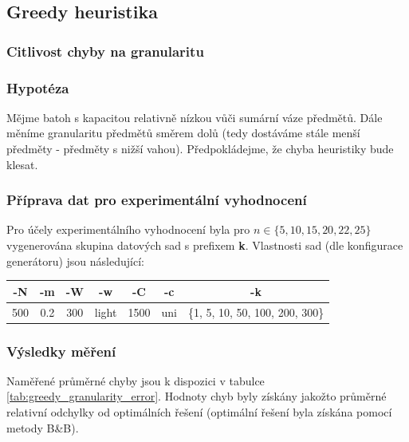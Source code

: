 \documentclass[12pt]{article}
\begin{document}
\subsection{Greedy heuristika}

\subsubsection{Citlivost chyby na granularitu}

\subsubsection*{Hypotéza} \label{section:greedy_granularity_hyp}

Mějme batoh s kapacitou relativně nízkou vůči sumární váze předmětů. Dále měníme granularitu předmětů směrem dolů (tedy dostáváme stále menší předměty - předměty s nižší vahou). Předpokládejme, že chyba heuristiky bude klesat.

\subsubsection*{Příprava dat pro experimentální vyhodnocení}

Pro účely experimentálního vyhodnocení byla pro $n \in \{5, 10, 15, 20, 22, 25\}$ vygenerována skupina datových sad s prefixem \textbf{k}.
Vlastnosti sad (dle konfigurace generátoru) jsou následující:

\begin{center}
    \begin{tabular}{|c | c | c | c | c | c | c|}
        \hline
        -N & -m & -W & -w & -C & -c & -k \\ [0.1ex]
        \hline\hline
        500 & 0.2 & 300 & light & 1500 & uni & \{1, 5, 10, 50, 100, 200, 300\}\\
        \hline
    \end{tabular}
\end{center}

\subsubsection*{Výsledky měření} \label{section:greedy_granularity_res}

Naměřené průměrné chyby jsou k dispozici v tabulce \ref{tab:greedy_granularity_error}. Hodnoty chyb byly získány jakožto průměrné relativní odchylky od optimálních řešení (optimální řešení byla získána pomocí metody B\&B).
\end{document}

